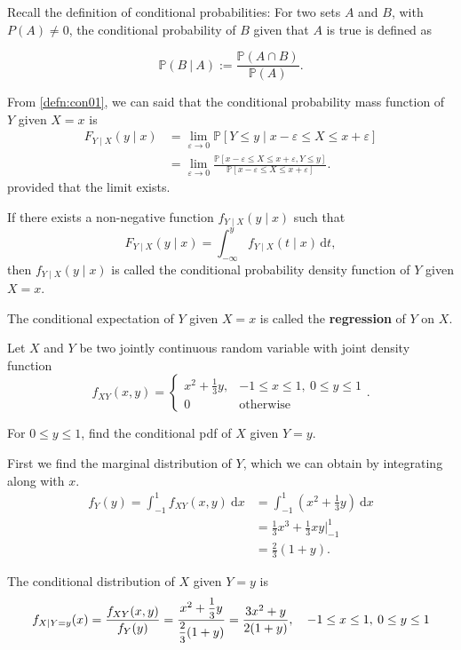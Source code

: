 Recall the definition of conditional probabilities: For two sets 
$A$ and $B$, with $P(A) \neq 0$, the conditional probability of $B$ 
given that $A$ is true is defined as 

\begin{equation}
    \mathbb{P}(B \> | \> A) := \frac{\mathbb{P}(A \cap B)}{\mathbb{P}(A)}.
\end{equation}

From \cref{defn:con01}, we can said that the conditional probability mass function of $Y$ given $X = x$ is
\begin{align*}
    F_{Y \mid X}(y \mid x) &= \lim_{\varepsilon \to 0} \mathbb{P}[Y \leq y \mid x - \varepsilon \leq X \leq x + \varepsilon]\\
    &= \lim_{\varepsilon \to 0} \frac{\mathbb{P}[x - \varepsilon \leq X \leq x + \varepsilon, Y \leq y]}{\mathbb{P}[x - \varepsilon \leq X \leq x + \varepsilon]}.
\end{align*}
provided that the limit exists.

If there exists a non-negative function $f_{Y \mid X}(y \mid x)$ such that
\begin{equation}
    F_{Y \mid X}(y \mid x) = \int_{-\infty}^{y} f_{Y \mid X}(t \mid x) \, \mathrm{d}t,
\end{equation}
then $f_{Y \mid X}(y \mid x)$ is called the conditional probability density function of $Y$ given $X = x$.

\begin{remark}
    The conditional expectation of $Y$ given $X = x$ is called the 
    \textbf{regression} of $Y$ on $X$.
\end{remark}

\begin{example}
    Let $X$ and $Y$ be two jointly continuous random variable with joint density function
    \[
        f_{XY}(x, y) = \begin{cases}
            x^2 + \frac{1}{3}y, & -1 \leq x \leq 1,\> 0 \leq y \leq 1\\
            0 & \text{otherwise}
        \end{cases}.
    \]

    For $0 \leq y \leq 1$, find the conditional pdf of $X$ given $Y = y$.
\end{example}
\begin{solution}
    First we find the marginal distribution of $Y$, which we can obtain by integrating 
    along with $x$.
    \begin{align*}
        f_Y(y) = \int_{-1}^{1} f_{XY}(x,y)\> \mathrm{d}x &= 
        \int_{-1}^{1} \left( x^2 + \frac{1}{3}y \right) \> \mathrm{d}x\\
        &= \frac{1}{3}x^3 + \frac{1}{3}xy \bigg \vert^1_{-1}\\
        &= \frac{2}{3}(1+y).
    \end{align*}

    The conditional distribution of $X$ given $Y=y$ is 
    \[
        f_{X|Y=y}(x) = \frac{f_{XY}(x,y)}{f_Y(y)} 
        = \frac{x^2 + \mfrac{1}{3}y}{\mfrac{2}{3}(1+y)}
        = \frac{3x^2 + y}{2(1+y)}, \quad -1 \leq x \leq 1,\> 0 \leq y \leq 1
    \]
\end{solution}

